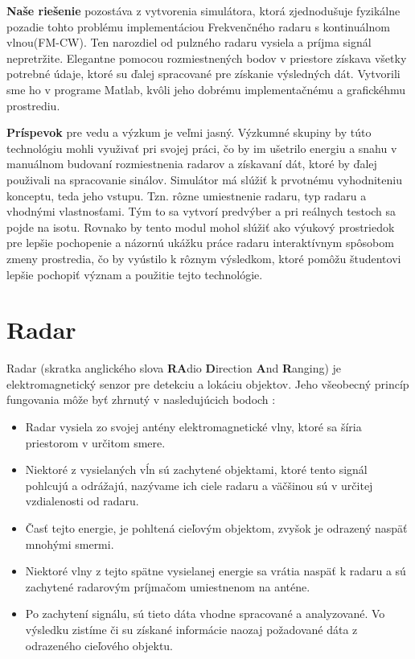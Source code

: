 \documentclass[slovak]{ExcelAtFIT} %
\begin{document}
\textbf{Naše riešenie} pozostáva z vytvorenia simulátora, ktorá zjednodušuje fyzikálne pozadie tohto problému implementáciou Frekvenčného radaru s kontinuálnom vlnou(FM-CW). Ten narozdiel od pulzného radaru vysiela a príjma signál nepretržite. Elegantne pomocou rozmiestnených bodov v priestore získava všetky potrebné údaje, ktoré su ďalej spracované pre získanie výsledných dát. Vytvorili sme ho v programe Matlab, kvôli jeho dobrému implementačnému a grafickéhmu prostrediu.

\textbf{Príspevok} pre vedu a výzkum je veľmi jasný. Vý\-zkumné skupiny by túto technológiu mohli využivať pri svojej práci, čo by im ušetrilo energiu a snahu v manuálnom budovaní rozmiestnenia radarov a získavaní dát, ktoré by ďalej použivali na spracovanie sinálov. 
Simulátor má slúžiť k prvotnému vyhodniteniu konceptu, teda jeho vstupu. Tzn. rôzne umiestnenie radaru, typ radaru a vhodnými vlastnosťami. Tým to sa vytvorí predvýber a pri reálnych testoch sa pojde na isotu. 
Rovnako by tento modul mohol slúžiť ako výukový prostriedok pre lepšie pochopenie a názornú ukážku práce radaru interaktívnym spôsobom zmeny prostredia, čo by vyústilo k rôznym výsledkom, ktoré pomôžu študentovi lepšie pochopiť význam a použitie tejto technológie.

\section{Radar}
\label{sec:Radar}
	\hspace{0.6cm}Radar (skratka anglického slova \textbf{RA}dio \textbf{D}irection \textbf{A}nd \textbf{R}anging) je elektromagnetický senzor pre detekciu a lokáciu objektov. Jeho všeobecný princíp fungovania môže byť zhrnutý v  nasledujúcich bodoch \cite{radartutor}\cite{radarhandbook}:
	\begin{itemize}
	\item Radar vysiela zo svojej antény elektromagnetické vlny, ktoré sa šíria priestorom v určitom smere.
	\item Niektoré z vysielaných vĺn sú zachytené objektami, ktoré tento signál pohlcujú a odrážajú, nazývame ich ciele radaru a väčšinou sú v určitej vzdialenosti od radaru.
	\item Časť tejto energie, je pohltená cieľovým objektom, zvyšok je odrazený naspäť mnohými smermi.
	\item Niektoré vlny z tejto spätne vysielanej energie sa vrátia naspäť k radaru a sú zachytené radarovým príjmačom umiestnenom na anténe.
	\item Po zachytení signálu, sú tieto dáta vhodne spracované a analyzované. Vo výsledku zistíme či su získané informácie naozaj požadované dáta z odrazeného cieľového objektu.
	\end{itemize}
\end{document}
